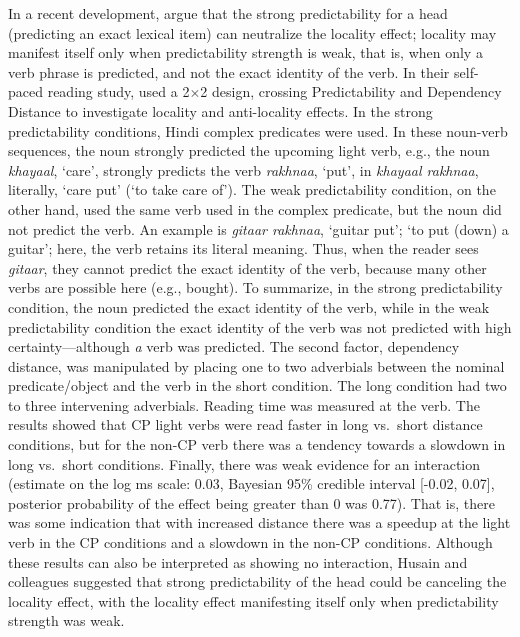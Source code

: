 \documentclass{frontiersSCNS}\usepackage{knitr} %
\begin{document}
In a recent development, \cite{husain2014strong} argue that the strong predictability for a head (predicting an exact lexical item) can neutralize the locality effect; locality may manifest itself only when predictability strength is weak, that is, when only a verb phrase is predicted, and not the exact identity of the verb.  
  In their self-paced reading study, \cite{husain2014strong} used a 2$\times$2 design, crossing Predictability and Dependency Distance to investigate locality and anti-locality effects. In the strong predictability conditions,  Hindi complex predicates were used. In these noun-verb sequences, the noun strongly predicted the upcoming light verb, e.g., the noun \textit{khayaal}, `care', strongly predicts the verb \textit{rakhnaa}, `put', in \textit{khayaal rakhnaa}, literally, `care put' (`to take care of'). The weak predictability condition, on the other hand, used the same verb used in the complex predicate, but the noun did not predict the verb. An example is  \textit{gitaar rakhnaa}, `guitar put'; `to put (down) a guitar'; here, the verb retains its literal meaning. Thus, when the reader sees \textit{gitaar}, they cannot predict the exact identity of the verb, because many other verbs are possible here (e.g., bought). 
  To summarize, in the strong predictability condition, the noun predicted the exact identity of the verb, while in the weak predictability condition the exact identity of the verb was not predicted with high certainty---although \textit{a} verb was predicted.  The second factor, dependency distance, was manipulated by placing one to two adverbials between the nominal predicate/object and the verb in the short condition. The long condition had two to three intervening adverbials. Reading time was measured at the verb. The results showed that CP light verbs were read faster in long vs.\ short distance conditions, but for the non-CP verb there was a tendency towards a slowdown in long vs.\ short conditions. Finally, there was weak evidence for an interaction (estimate on the log ms scale: 0.03, Bayesian 95\% credible interval [-0.02, 0.07], posterior probability of the effect being greater than 0 was 0.77). That is, there was some indication that with increased distance there was a speedup at the light verb in the CP conditions and a slowdown in the non-CP conditions. Although these results can also be interpreted as showing no interaction,  Husain and colleagues suggested that strong predictability of the head could be canceling the locality effect, with the locality effect manifesting itself only when predictability strength was weak. 
  
\end{document}
